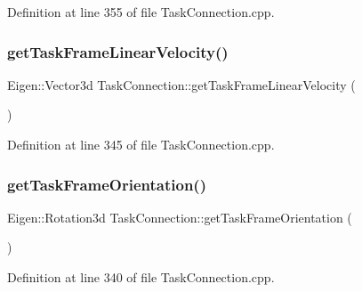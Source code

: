 Definition at line 355 of file Task\+Connection.\+cpp.

\hypertarget{classocra__recipes_1_1TaskConnection_ab0948b1336f171e607ca79ca03a466c5}{}\label{classocra__recipes_1_1TaskConnection_ab0948b1336f171e607ca79ca03a466c5} 
\subsubsection{\texorpdfstring{get\+Task\+Frame\+Linear\+Velocity()}{getTaskFrameLinearVelocity()}}
{\footnotesize\ttfamily Eigen\+::\+Vector3d Task\+Connection\+::get\+Task\+Frame\+Linear\+Velocity (\begin{DoxyParamCaption}{ }\end{DoxyParamCaption})}



Definition at line 345 of file Task\+Connection.\+cpp.

\hypertarget{classocra__recipes_1_1TaskConnection_a4163584c89cc8680131bd473b9359ffb}{}\label{classocra__recipes_1_1TaskConnection_a4163584c89cc8680131bd473b9359ffb} 
\subsubsection{\texorpdfstring{get\+Task\+Frame\+Orientation()}{getTaskFrameOrientation()}}
{\footnotesize\ttfamily Eigen\+::\+Rotation3d Task\+Connection\+::get\+Task\+Frame\+Orientation (\begin{DoxyParamCaption}{ }\end{DoxyParamCaption})}



Definition at line 340 of file Task\+Connection.\+cpp.

\hypertarget{classocra__recipes_1_1TaskConnection_a263fc00649e98cfa61393f63cfe9f84a}{}\label{classocra__recipes_1_1TaskConnection_a263fc00649e98cfa61393f63cfe9f84a} 
